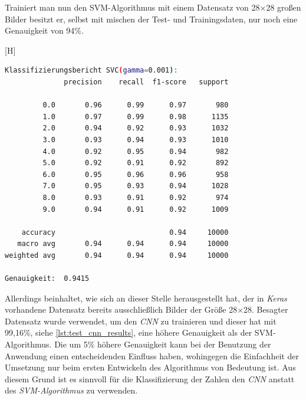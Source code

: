 Trainiert man nun den SVM-Algorithmus mit einem Datensatz von 28×28 großen Bilder besitzt er, selbst mit mischen der Test- und Trainingsdaten, nur noch eine Genauigkeit von 94\%.\par
\begin{minipage}{\textwidth}[H]
    \begin{lstlisting}[language=Bash, caption=Testergebnisse der SVM mit 28x28 großen Bildern, label=lst:testergebnis_svm_groß]
Klassifizierungsbericht SVC(gamma=0.001):
              precision    recall  f1-score   support

         0.0       0.96      0.99      0.97       980
         1.0       0.97      0.99      0.98      1135
         2.0       0.94      0.92      0.93      1032
         3.0       0.93      0.94      0.93      1010
         4.0       0.92      0.95      0.94       982
         5.0       0.92      0.91      0.92       892
         6.0       0.95      0.96      0.96       958
         7.0       0.95      0.93      0.94      1028
         8.0       0.93      0.91      0.92       974
         9.0       0.94      0.91      0.92      1009

    accuracy                           0.94     10000
   macro avg       0.94      0.94      0.94     10000
weighted avg       0.94      0.94      0.94     10000

Genauigkeit:  0.9415
	\end{lstlisting}
\end{minipage}
Allerdings beinhaltet, wie sich an dieser Stelle herausgestellt hat, der in \textit{Keras} vorhandene Datensatz bereits ausschließlich Bilder der Größe 28×28. Besagter Datensatz wurde verwendet, um den \textit{CNN} zu trainieren und dieser hat mit 99,16\%, siehe \ref{lst:test_cnn_results}, eine höhere Genauigkeit als der SVM-Algorithmus. Die um 5\% höhere Genauigkeit kann bei der Benutzung der Anwendung einen entscheidenden Einfluss haben, wohingegen die Einfachheit der Umsetzung nur beim ersten Entwickeln des Algorithmus von Bedeutung ist. Aus diesem Grund ist es sinnvoll für die Klassifizierung der Zahlen den \textit{CNN} anstatt des \textit{SVM-Algorithmus} zu verwenden.
